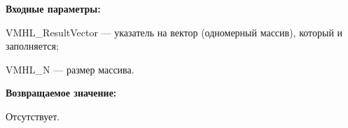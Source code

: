 \textbf{Входные параметры:}

 VMHL\_ResultVector --- указатель на вектор (одномерный массив), который и заполняется;
 
 VMHL\_N --- размер массива.

\textbf{Возвращаемое значение:}

Отсутствует.
